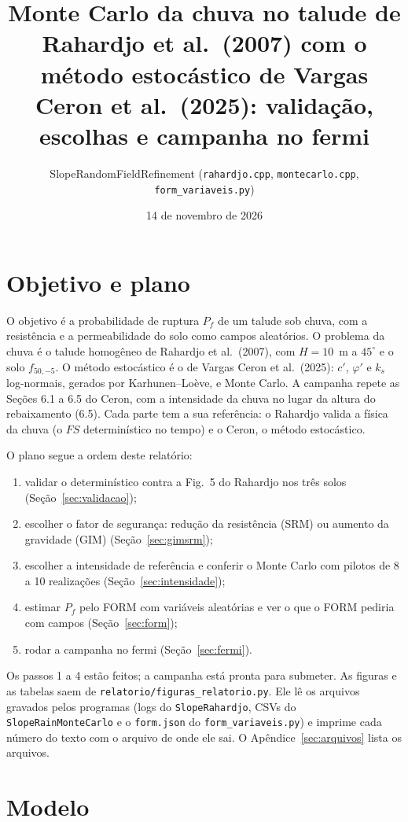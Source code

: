 \documentclass[11pt,a4paper]{article}
\author{SlopeRandomFieldRefinement (\texttt{rahardjo.cpp}, \texttt{montecarlo.cpp}, \texttt{form\_variaveis.py})}
\title{Monte Carlo da chuva no talude de Rahardjo et al.\ (2007) com o método estocástico de Vargas Ceron et al.\
(2025): validação, escolhas e campanha no fermi}
\date{14 de novembro de 2026}
\begin{document}
\maketitle

\section{Objetivo e plano}\label{sec:objetivo}
O objetivo é a probabilidade de ruptura $P_f$ de um talude sob chuva, com a resistência e a permeabilidade do solo como
campos aleatórios. O problema da chuva é o talude homogêneo de Rahardjo et al.\ (2007), com $H = 10$~m a $45^\circ$ e o
solo $f_{50,-5}$. O método estocástico é o de Vargas Ceron et al.\ (2025): $c'$, $\varphi'$ e $k_s$ log-normais, gerados
por Karhunen--Loève, e Monte Carlo. A campanha repete as Seções 6.1 a 6.5 do Ceron, com a intensidade da chuva no lugar
da altura do rebaixamento (6.5). Cada parte tem a sua referência: o Rahardjo valida a física da chuva (o $FS$
determinístico no tempo) e o Ceron, o método estocástico.

O plano segue a ordem deste relatório:
\begin{enumerate}
\item validar o determinístico contra a Fig.~5 do Rahardjo nos três solos (Seção~\ref{sec:validacao});
\item escolher o fator de segurança: redução da resistência (SRM) ou aumento da gravidade (GIM)
(Seção~\ref{sec:gimsrm});
\item escolher a intensidade de referência e conferir o Monte Carlo com pilotos de 8 a 10 realizações
(Seção~\ref{sec:intensidade});
\item estimar $P_f$ pelo FORM com variáveis aleatórias e ver o que o FORM pediria com campos (Seção~\ref{sec:form});
\item rodar a campanha no fermi (Seção~\ref{sec:fermi}).
\end{enumerate}
Os passos 1 a 4 estão feitos; a campanha está pronta para submeter. As figuras e as tabelas saem de
\texttt{relatorio/figuras\_relatorio.py}. Ele lê os arquivos gravados pelos programas (logs do \texttt{SlopeRahardjo},
CSVs do \texttt{SlopeRainMonteCarlo} e o \texttt{form.json} do \texttt{form\_variaveis.py}) e imprime cada número do
texto com o arquivo de onde ele sai. O Apêndice~\ref{sec:arquivos} lista os arquivos.

\section{Modelo}\label{sec:modelo}
\end{document}
